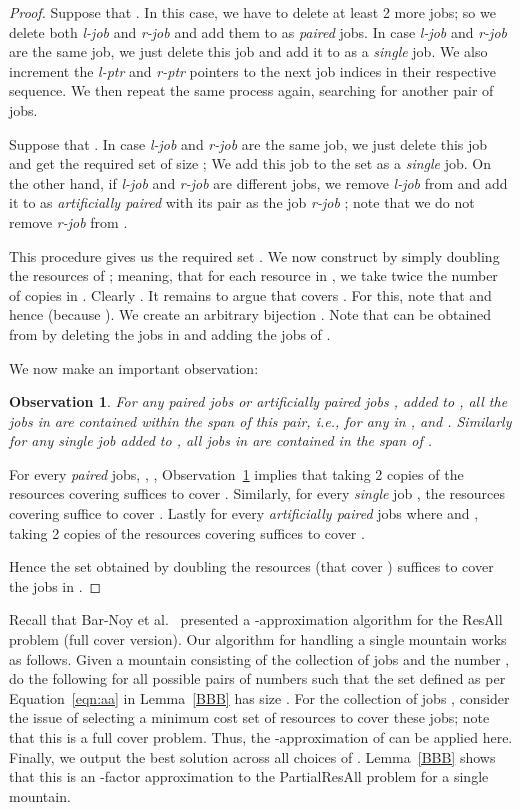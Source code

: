 \documentclass[11pt]{article}
\newtheorem{observation}[theorem]{Observation}
\newtheorem{proof}[theorem]{Proof}
\newcommand{\ResAll} {{\sc ResAll}}
\newcommand{\PResAll}{{\sc PartialResAll}}
\newcommand{\lptr}{{\em l-ptr}}
\newcommand{\rptr}{{\em r-ptr}}
\newcommand{\ljob}{{\em l-job}}
\newcommand{\rjob}{{\em r-job}}
\begin{document}
\begin{proof}
Suppose that .
In this case, we have to delete at least 2 more jobs; so we delete both {\ljob} and {\rjob} and add them to 
as {\em paired} jobs.
In case {\ljob} and {\rjob} are the same job, we just delete this job and add it to  as a {\em single} job.
We also increment the {\lptr} and {\rptr} pointers to the next job indices in their respective sequence.
We then repeat the same process again, searching for another pair of jobs.

Suppose that .
In case {\ljob} and {\rjob} are the same job, we just delete this job and get the required set  of size ;
We add this job to the set  as a {\em single} job.
On the other hand, if {\ljob} and {\rjob} are different jobs,
we remove {\ljob} from  and add it to  as {\em artificially paired} with
its pair as the job {\rjob} ; note that we do not remove {\rjob} from .

This procedure gives us the required set .
We now construct  by simply doubling the resources of ; meaning, that for each 
resource in , we take twice the number of copies in . 
Clearly .
It remains to argue that  covers .
For this, note that  and hence  (because ).
We create an arbitrary bijection .
Note that  can be obtained from  by deleting the jobs in  and adding the jobs of .

We now make an important observation:
\begin{observation}
\label{obs1}
For any {\em paired} jobs or {\em artificially paired} jobs ,  added to , 
all the jobs in  are contained within the
span of this pair, i.e., for any  in ,  and .
Similarly for any {\em single} job  added to , all jobs in  are contained in the span of .
\end{observation}

For every {\em paired} jobs, , , Observation~\ref{obs1} implies that taking 2 copies of the 
resources covering  suffices to cover .
Similarly, for every {\em single} job , the resources covering  suffice to cover .
Lastly for every {\em artificially paired} jobs  where  and , taking 2 copies
of the resources covering  suffices to cover .

Hence the set  obtained by doubling the resources  (that cover ) suffices to cover the jobs in .
\end{proof}

Recall that Bar-Noy et al.~\cite{Bar-Noy} presented a -approximation algorithm for 
the {\ResAll} problem (full cover version). Our algorithm for handling a single mountain works
as follows. 
Given a mountain consisting of the collection of jobs  and the number , 
do the following for all possible pairs of numbers  such that the set 
 defined as per Equation~\ref{eqn:aa} in Lemma~\ref{BBB} has size .
For the collection of jobs , consider the issue of selecting a minimum cost set of 
resources to cover these jobs; note that this is a full cover problem. Thus, the -approximation
of \cite{Bar-Noy} can be applied here. 
Finally, we output the best solution across 
all choices of .  Lemma~\ref{BBB} shows that this is an -factor approximation
to the {\PResAll} problem for a single mountain. 
\end{document}
